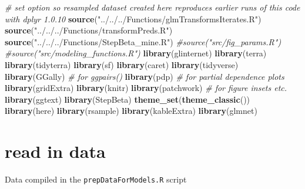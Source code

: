 \documentclass[
]{article}
\newenvironment{Shaded}{\begin{snugshade}}{\end{snugshade}}
\newcommand{\CommentTok}[1]{\textcolor[rgb]{0.56,0.35,0.01}{\textit{#1}}}
\newcommand{\FunctionTok}[1]{\textcolor[rgb]{0.13,0.29,0.53}{\textbf{#1}}}
\newcommand{\NormalTok}[1]{#1}
\newcommand{\StringTok}[1]{\textcolor[rgb]{0.31,0.60,0.02}{#1}}
\begin{document}
\begin{Shaded}
\begin{Highlighting}[]
\CommentTok{\# set option so resampled dataset created here reproduces earlier runs of this code with dplyr 1.0.10}
\FunctionTok{source}\NormalTok{(}\StringTok{"../../../Functions/glmTransformsIterates.R"}\NormalTok{)}
\FunctionTok{source}\NormalTok{(}\StringTok{"../../../Functions/transformPreds.R"}\NormalTok{)}
\FunctionTok{source}\NormalTok{(}\StringTok{"../../../Functions/StepBeta\_mine.R"}\NormalTok{)}
\CommentTok{\#source("src/fig\_params.R")}
\CommentTok{\#source("src/modeling\_functions.R")}
\FunctionTok{library}\NormalTok{(glinternet)}
\FunctionTok{library}\NormalTok{(terra)}
\FunctionTok{library}\NormalTok{(tidyterra)}
\FunctionTok{library}\NormalTok{(sf)}
\FunctionTok{library}\NormalTok{(caret)}
\FunctionTok{library}\NormalTok{(tidyverse)}
\FunctionTok{library}\NormalTok{(GGally) }\CommentTok{\# for ggpairs()}
\FunctionTok{library}\NormalTok{(pdp) }\CommentTok{\# for partial dependence plots}
\FunctionTok{library}\NormalTok{(gridExtra)}
\FunctionTok{library}\NormalTok{(knitr)}
\FunctionTok{library}\NormalTok{(patchwork) }\CommentTok{\# for figure insets etc. }
\FunctionTok{library}\NormalTok{(ggtext)}
\FunctionTok{library}\NormalTok{(StepBeta)}
\FunctionTok{theme\_set}\NormalTok{(}\FunctionTok{theme\_classic}\NormalTok{())}
\FunctionTok{library}\NormalTok{(here)}
\FunctionTok{library}\NormalTok{(rsample)}
\FunctionTok{library}\NormalTok{(kableExtra)}
\FunctionTok{library}\NormalTok{(glmnet)}
\end{Highlighting}
\end{Shaded}

\section{read in data}\label{read-in-data}

Data compiled in the \texttt{prepDataForModels.R} script
\end{document}
